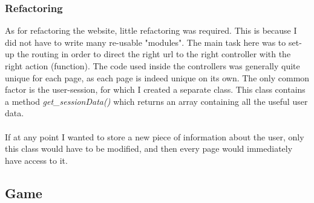 \documentclass[12pt]{report}
\begin{document}
\subsubsection{Refactoring}
As for refactoring the website, little refactoring was required. This is because I did not have to write many re-usable "modules". The main task here was to set-up the routing in order to direct the right url to the right controller with the right action (function). The code used inside the controllers was generally quite unique for each page, as each page is indeed unique on its own. The only common factor is the user-session, for which I created a separate class. This class contains a method \emph{get\_sessionData()} which returns an array containing all the useful user data.\\\\
If at any point I wanted to store a new piece of information about the user, only this class would have to be modified, and then every page would immediately have access to it.\\

\subsection*{Game}
\end{document}
